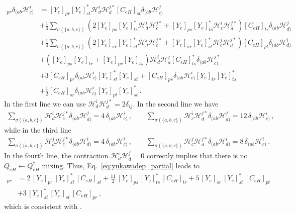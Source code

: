 \begin{align}
    [\dot C_{eH}]_{pr} \delta_{(ab}\mathcal H_{c)}^{i} &= 
     [Y_e]_{pr}[Y_e]^*_{st}\mathcal H_d^{i}\mathcal H_d^{j*}[C_{eH}]_{st}\delta_{(ab}\mathcal H_{c)}^{j}
     \nonumber 
\\
    & + \frac{1}{4}\sum_{\sigma(\{a,b,c\})}
    \left(2[Y_e]_{ps}[Y_e]^*_{ts}\mathcal H_d^{i}\mathcal H_c^{j*}+[Y_e]_{ps}[Y_e]^*_{ts}\mathcal H_c^{i}\mathcal H_d^{j*}\right) [C_{eH}]_{tr}\delta_{(ab}\mathcal H_{d)}^{j}
    \nonumber \\
    & + \frac{1}{4}\sum_{\sigma(\{a,b,c\})}
    \left(2[Y_e]_{sr}[Y_e]^*_{st}\mathcal H_d^{j}\mathcal H_c^{j*}+[Y_e]_{sr}[Y_e]^*_{st}\mathcal H_c^{j}\mathcal H_d^{j*}\right)[C_{eH}]_{pt}\delta_{(ab}\mathcal H_{d)}^{i}\nonumber \\
    &+
    \left([Y_e]_{ps} [Y_e]_{tr}  + [Y_e]_{pr} [Y_e]_{ts} \right)\mathcal H_d^{i}\mathcal H_d^{j}[C_{eH}]^*_{ts}\delta_{(ab}\mathcal H_{c)}^{j*}
    \nonumber
\\
    &  + 3 [C_{eH}]_{pr}\delta_{(ab}\mathcal H_{c)}^{i} [Y_e]^*_{st}[Y_e]_{st} + [C_{eH}]_{ps}\delta_{(ab}\mathcal H_{c)}^{i}[Y_e]_{tr}[Y_e]^*_{ts}\nonumber \\&+ \frac{1}{2}[C_{eH}]_{sr}\delta_{(ab}\mathcal H_{c)}^{i}[Y_e]_{pt}[Y_e]_{st}^* \,.\label{eq:yukawadep_partial}
\end{align}
In the first line we can use $\mathcal H^i_d \mathcal H^{j*}_d = 2\delta_{ij}$.
In the second line we have
\begin{align}
    \sum_{\sigma(\{a,b,c\})} \mathcal H_d^{i}\mathcal H_c^{j*} \delta_{(ab}\mathcal H_{d)}^{j} = 4\, \delta_{(ab}\mathcal H^i_{c)}\,,
    \qquad
    \sum_{\sigma(\{a,b,c\})} \mathcal H_c^{i}\mathcal H_d^{j*} \delta_{(ab}\mathcal H_{d)}^{j} = 12\, \delta_{(ab}\mathcal H^i_{c)}\,,
\end{align}
while in the third line
\begin{align}
    \sum_{\sigma(\{a,b,c\})} \mathcal H_d^{j}\mathcal H_c^{j*} \delta_{(ab}\mathcal H_{d)}^{i} = 4\, \delta_{(ab}\mathcal H^i_{c)}\,,
    \qquad
    \sum_{\sigma(\{a,b,c\})} \mathcal H_c^{j}\mathcal H_d^{j*} \delta_{(ab}\mathcal H_{d)}^{i} = 8\, \delta_{(ab}\mathcal H^i_{c)}\,.
\end{align}
In the fourth line, the contraction $\mathcal H^i_d \mathcal H^j_d = 0$ correctly implies that there is no $Q_{eH} \leftarrow Q_{eH}^\dagger$ mixing.
Thus, Eq.~\eqref{eq:yukawadep_partial} leads to
\begin{align}
    [\dot C_{eH}]_{pr}
    &=
    2\, [Y_e]_{pr}\,[Y_e]^*_{st}\,[C_{eH}]_{st}
      + 
    \frac{11}{2}\,[Y_e]_{ps}\,[Y_e]^*_{ts}\, [C_{eH}]_{tr}
     + 5\,
    [Y_e]_{sr}\,[Y_e]^*_{st}\,[C_{eH}]_{pt}\nonumber \\
    &  + 3\, [Y_e]^*_{st}\,[Y_e]_{st} \,[C_{eH}]_{pr}
    \,,
\end{align}
which is consistent with \cite{Jenkins:2013wua}.

